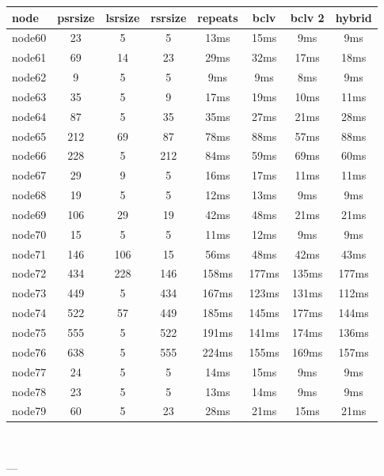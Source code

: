 \begin{tabular}{|l|c|c|c|c|c|c|c|}
\hline node & psrsize & lsrsize & rsrsize   & repeats & bclv & bclv 2 & hybrid\\
    \hline node60 & 23 & 5 & 5 & 13ms & 15ms & 9ms & 9ms\\
    \hline node61 & 69 & 14 & 23 & 29ms & 32ms & 17ms & 18ms\\
    \hline node62 & 9 & 5 & 5 & 9ms & 9ms & 8ms & 9ms\\
    \hline node63 & 35 & 5 & 9 & 17ms & 19ms & 10ms & 11ms\\
    \hline node64 & 87 & 5 & 35 & 35ms & 27ms & 21ms & 28ms\\
    \hline node65 & 212 & 69 & 87 & 78ms & 88ms & 57ms & 88ms\\
    \hline node66 & 228 & 5 & 212 & 84ms & 59ms & 69ms & 60ms\\
    \hline node67 & 29 & 9 & 5 & 16ms & 17ms & 11ms & 11ms\\
    \hline node68 & 19 & 5 & 5 & 12ms & 13ms & 9ms & 9ms\\
    \hline node69 & 106 & 29 & 19 & 42ms & 48ms & 21ms & 21ms\\
    \hline node70 & 15 & 5 & 5 & 11ms & 12ms & 9ms & 9ms\\
    \hline node71 & 146 & 106 & 15 & 56ms & 48ms & 42ms & 43ms\\
    \hline node72 & 434 & 228 & 146 & 158ms & 177ms & 135ms & 177ms\\
    \hline node73 & 449 & 5 & 434 & 167ms & 123ms & 131ms & 112ms\\
    \hline node74 & 522 & 57 & 449 & 185ms & 145ms & 177ms & 144ms\\
    \hline node75 & 555 & 5 & 522 & 191ms & 141ms & 174ms & 136ms\\
    \hline node76 & 638 & 5 & 555 & 224ms & 155ms & 169ms & 157ms\\
    \hline node77 & 24 & 5 & 5 & 14ms & 15ms & 9ms & 9ms\\
    \hline node78 & 23 & 5 & 5 & 13ms & 14ms & 9ms & 9ms\\
    \hline node79 & 60 & 5 & 23 & 28ms & 21ms & 15ms & 21ms\\

\hline
\end{tabular} \

---


